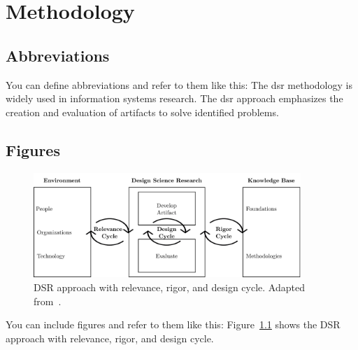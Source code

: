 \chapter{Methodology}
\label{chap:methodology}

\section{Abbreviations}

You can define abbreviations and refer to them like this: The \gls{dsr} methodology is widely used in information systems research. The \gls{dsr} approach emphasizes the creation and evaluation of artifacts to solve identified problems.

\section{Figures}

\begin{figure}[htbp!]
    \centering
    \includegraphics[width=0.9\textwidth]{figures/design-science-generic.png}
    \caption[DSR approach with relevance, rigor, and design cycle.]{DSR approach with relevance, rigor, and design cycle. Adapted from~\textcite{hevner2004design}.}
    \label{fig:design-science-generic}
\end{figure}

You can include figures and refer to them like this: Figure~\ref{fig:design-science-generic} shows the DSR approach with relevance, rigor, and design cycle.
